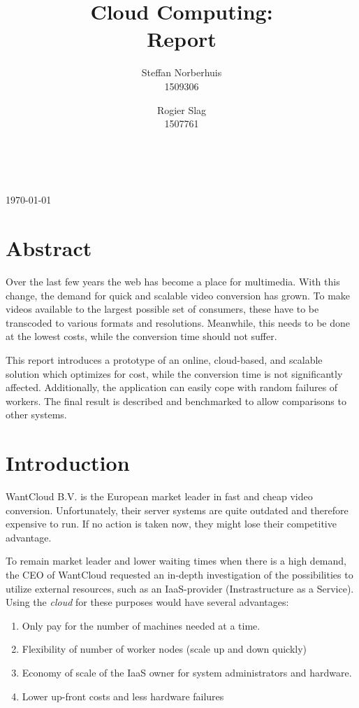 \documentclass[a4paper]{IEEEtran}
\title{Cloud Computing: \\ Report}
\author{Steffan Norberhuis\\ 1509306 \and
 Rogier Slag\\ 1507761}
\author{
    \IEEEauthorblockN{Steffan Norberhuis, Rogier Slag}\\
    \IEEEauthorblockA{1509306, 1507761}
}
\begin{document}
\maketitle
\begin{center}
\today
\end{center}

\section{Abstract}

Over the last few years the web has become a place for multimedia.
With this change, the demand for quick and scalable video conversion has grown.
To make videos available to the largest possible set of consumers, these have to be transcoded to various formats and resolutions.
Meanwhile, this needs to be done at the lowest costs, while the conversion time should not suffer.

This report introduces a prototype of an online, cloud-based, and scalable solution which optimizes for cost, while the conversion time is not significantly affected. 
Additionally, the application can easily cope with random failures of workers.
The final result is described and benchmarked to allow comparisons to other systems.

\section{Introduction}


WantCloud B.V. is the European market leader in fast and cheap video conversion.
Unfortunately, their server systems are quite outdated and therefore expensive to run.
If no action is taken now, they might lose their competitive advantage.

To remain market leader and lower waiting times when there is a high demand, the CEO of WantCloud requested an in-depth investigation of the possibilities to utilize external resources, such as an IaaS-provider (Instrastructure as a Service).
Using the \textit{cloud} for these purposes would have several advantages:

\begin{enumerate}
\item Only pay for the number of machines needed at a time.
\item Flexibility of number of worker nodes (scale up and down quickly)
\item Economy of scale of the IaaS owner for system administrators and hardware.
\item Lower up-front costs and less hardware failures
\end{enumerate}
\end{document}
